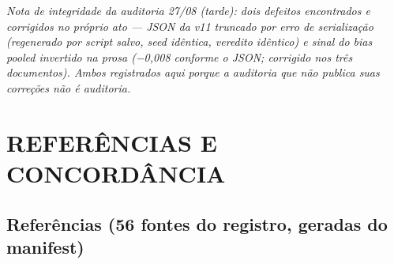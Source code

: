 \documentclass[
  12pt,
]{report}
\begin{document}
\emph{Nota de integridade da auditoria 27/08 (tarde): dois defeitos
encontrados e corrigidos no próprio ato --- JSON da v11 truncado por
erro de serialização (regenerado por script salvo, seed idêntica,
veredito idêntico) e sinal do bias pooled invertido na prosa (−0,008
conforme o JSON; corrigido nos três documentos). Ambos registrados aqui
porque a auditoria que não publica suas correções não é auditoria.}

\hypertarget{referuxeancias-e-concorduxe2ncia}{%
\section{REFERÊNCIAS E
CONCORDÂNCIA}\label{referuxeancias-e-concorduxe2ncia}}

\hypertarget{referuxeancias-56-fontes-do-registro-geradas-do-manifest}{%
\subsection{Referências (56 fontes do registro, geradas do
manifest)}\label{referuxeancias-56-fontes-do-registro-geradas-do-manifest}}
\end{document}
